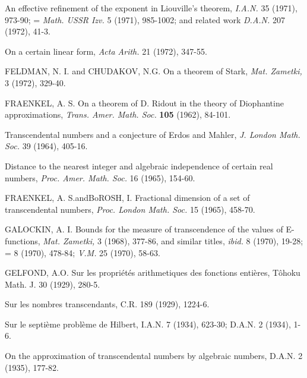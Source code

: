 \begin{hanglist}
    \item \hspace{1.5em} An effective refinement of the exponent in Liouville's theorem, \textit{I.A.N.} 35 (1971), 973-90; = \textit{Math. USSR Izv.} 5 (1971), 985-1002; and related work \textit{D.A.N.} 207 (1972), 41-3.
    \item \hspace{1.5em} On a certain linear form, \textit{Acta Arith.} 21 (1972), 347-55.
    \item FELDMAN, N. I. and CHUDAKOV, N.G. On a theorem of Stark, \textit{Mat. Zametki,} 3 (1972), 329-40.
    \item FRAENKEL, A. S. On a theorem of D. Ridout in the theory of Diophantine approximations, \textit{Trans. Amer. Math. Soc.} \textbf{105} (1962), 84-101.
    \item \hspace{1.5em} Transcendental numbers and a conjecture of Erdos and Mahler, \textit{J. London Math. Soc.} 39 (1964), 405-16.
    \item \hspace{1.5em} Distance to the nearest integer and algebraic independence of certain real numbers, \textit{Proc. Amer. Math. Soc.} 16 (1965), 154-60.
    \item FRAENKEL, A. S.andBoROSH, I. Fractional dimension of a set of transcendental numbers, \textit{Proc. London Math. Soc.} 15 (1965), 458-70.
    \item GALOCKIN, A. I. Bounds for the measure of transcendence of the values of E-functions, \textit{Mat. Zametki,} 3 (1968), 377-86, and similar titles, \textit{ibid.} 8 (1970), 19-28; = 8 (1970), 478-84; \textit{V.M.} 25 (1970), 58-63.
    \item GELFOND, A.O. Sur les propriétés arithmetiques des fonctions entières, Tôhoku Math. J. 30 (1929), 280-5.
    \item \hspace{1.5em} Sur les nombres transcendants, C.R. 189 (1929), 1224-6.
    \item \hspace{1.5em} Sur le septième problème de Hilbert, I.A.N. 7 (1934), 623-30; D.A.N. 2 (1934), 1-6.
    \item \hspace{1.5em} On the approximation of transcendental numbers by algebraic numbers, D.A.N. 2 (1935), 177-82.

\end{hanglist}
